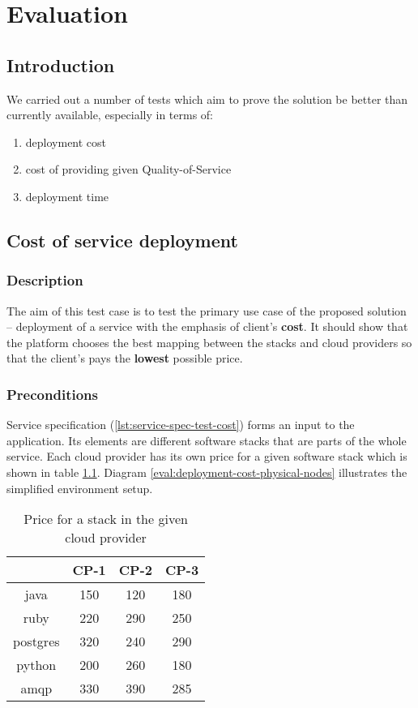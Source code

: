 \chapter{Evaluation}


\section{Introduction}
We carried out a number of tests which aim to prove the solution be better than currently available, especially in terms of:
\begin{enumerate}
  \item deployment cost
  \item cost of providing given Quality-of-Service
  \item deployment time
\end{enumerate}

\section{Cost of service deployment}
\subsection*{Description}
The aim of this test case is to test the primary use case of the proposed solution -- deployment of a service with the emphasis of client's \textbf{cost}. It should show that the platform chooses the best mapping between the stacks and cloud providers so that the client's pays the \textbf{lowest} possible price.

\subsection*{Preconditions}
Service specification (\ref{lst:service-spec-test-cost}) forms an input to the application. Its elements are different software stacks that are parts of the whole service. Each cloud provider has its own price for a given software stack which is shown in table \ref{tbl:test-service-deployment-cost}. Diagram \ref{eval:deployment-cost-physical-nodes} illustrates the simplified environment setup.

\begin{table}
  \centering
  \begin{tabular}{ | c | c | c | c | }
    \hline                        
    & CP-1 & CP-2 & CP-3 \\
    \hline
    java      & 150 & 120 & 180 \\
    ruby      & 220 & 290 & 250 \\
    postgres  & 320 & 240 & 290 \\
    python    & 200 & 260 & 180 \\
    amqp      & 330 & 390 & 285 \\
    \hline  
  \end{tabular}
  \caption{Price for a stack in the given cloud provider}
  \label{tbl:test-service-deployment-cost}
\end{table}

